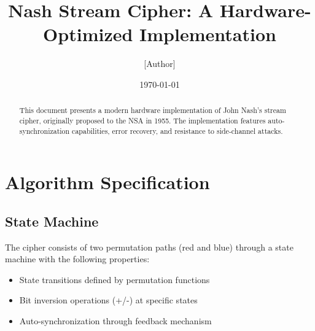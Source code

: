 \documentclass[11pt]{article}
\title{Nash Stream Cipher: A Hardware-Optimized Implementation}
\author{[Author]}
\date{\today}
\begin{document}
\maketitle

\begin{abstract}
This document presents a modern hardware implementation of John Nash's stream cipher, originally proposed to the NSA in 1955. The implementation features auto-synchronization capabilities, error recovery, and resistance to side-channel attacks.
\end{abstract}

\section{Algorithm Specification}
\subsection{State Machine}
The cipher consists of two permutation paths (red and blue) through a state machine with the following properties:
\begin{itemize}
    \item State transitions defined by permutation functions
    \item Bit inversion operations (+/-) at specific states
    \item Auto-synchronization through feedback mechanism
\end{itemize}
\end{document}
